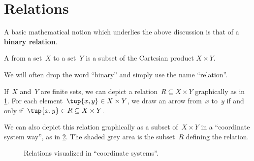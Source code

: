 

\section{Relations}\label{sec:connection-relations}

A basic mathematical notion which underlies the above discussion is that of a \textbf{binary relation}.


\begin{definition}
  \label{def:binary-relation}
  A \emph{} from a set~$X$ to a set~$Y$ is a subset of the Cartesian product $X\times Y$.
\end{definition}

\begin{remark}
  We will often drop the word ``binary'' and simply use the name ``relation''.
\end{remark}


If~$X$ and~$Y$ are finite sets, we can depict a relation~$R \subseteq X \times Y$ graphically as in \cref{fig:example_rel}. For each element~$\tup{x,y} \in X \times Y$, we draw an arrow from~$x$ to~$y$ if and only if~$\tup{x,y} \in R \subseteq X \times Y$.

\begin{figure}[h!]
  \centering
  \caption{\label{fig:example_rel}}
\end{figure}

We can also depict this relation graphically as a subset of~$X \times Y$ in a ``coordinate system way'', as in \cref{fig:example_rel_coord}. The shaded grey area is the subset~$R$ defining the relation.
%

\begin{figure}[h!]
  \begin{center}
  \end{center}
  \caption{Relations visualized in ``coordinate systems''.}
  \label{fig:example_rel_coord}
\end{figure}


